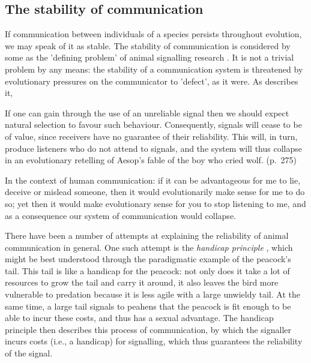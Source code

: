 \subsection{The stability of communication}
\label{sec:S-P08}



If communication between individuals of a species persists throughout evolution, we may speak of it as stable. The stability of communication is considered by some as the 'defining problem' of animal signalling research \citep{Scott-Phillips08}. It is not a trivial problem by any means: the stability of a communication system is threatened by evolutionary pressures on the communicator to 'defect', as it were. As \citet{Scott-Phillips08} describes it,
\begin{quoting}
    If one can gain through the use of an unreliable signal then we should expect natural selection to favour such behaviour. Consequently, signals will cease to be of value, since receivers have no guarantee of their reliability. This will, in turn, produce listeners who do not attend to signals, and the system will thus collapse in an evolutionary retelling of Aesop’s fable of the boy who cried wolf.
    \hfill (p.~275)
\end{quoting}
In the context of human communication: if it can be advantageous for me to lie, deceive or mislead someone, then it would evolutionarily make sense for me to do so; yet then it would make evolutionary sense for you to stop listening to me, and as a consequence our system of communication would collapse.

There have been a number of attempts at explaining the reliability of animal communication in general. One such attempt is the \emph{handicap principle} \citep{Zahavi75, Zahavi99}, which might be best understood through the paradigmatic example of the peacock's tail. This tail is like a handicap for the peacock: not only does it take a lot of resources to grow the tail and carry it around, it also leaves the bird more vulnerable to predation because it is less agile with a large unwieldy tail. At the same time, a large tail signals to peahens that the peacock is fit enough to be able to incur these costs, and thus has a sexual advantage.
The handicap principle then describes this process of communication, by which the signaller incurs costs (i.e., a handicap) for signalling, which thus guarantees the reliability of the signal.

